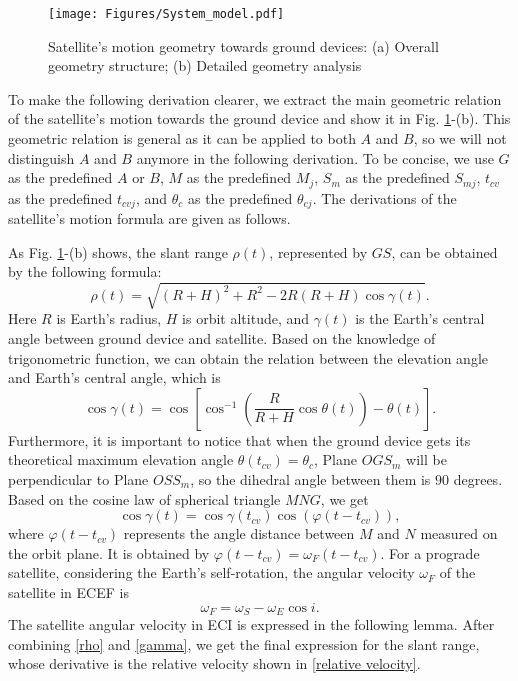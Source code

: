 \documentclass{IEEEtaes}
\theoremstyle{plain}
\begin{document}
\begin{figure}[ht]
  \centering
  \texttt{[image: Figures/System\_model.pdf]}
  \caption{Satellite's motion geometry towards ground devices: (a) Overall geometry structure; (b) Detailed geometry analysis}
  \label{orbit}
\end{figure}
\vspace{-1pt}
To make the following derivation clearer, we extract the main geometric relation of the satellite's motion towards the ground device and show it in Fig. \ref{orbit}-(b). This geometric relation is general as it can be applied to both $A$ and $B$, so we will not distinguish $A$ and $B$ anymore in the following derivation. To be concise, we use $G$ as the predefined $A$ or $B$, $M$ as the predefined $M_{j}$, $S_m$ as the predefined $S_{mj}$, $t_{cv}$ as the predefined $t_{c\!v\!j}$, and $\theta_c$ as the predefined $\theta_{c\!j}$. The derivations of the satellite's motion formula are given as follows.

As Fig. \ref{orbit}-(b) shows, the slant range $\rho(t)$, represented by $GS$, can be obtained by the following formula:
\begin{equation}
  \label{rho}
  \rho(t) = \sqrt{(R+H)^2+R^2-2R(R+H)\cos\gamma(t)}.
\end{equation}
Here $R$ is Earth's radius, $H$ is orbit altitude, and $\gamma(t)$ is the Earth's central angle between ground device and satellite. Based on the knowledge of trigonometric function, we can obtain the relation between the elevation angle and Earth's central angle, which is
\begin{equation}
  \label{gamma and elev}
  \cos\gamma(t) = \cos\left[\cos^{-1}\left (\frac{R}{R+H}\cos\theta(t)\right)-\theta(t)\right].
\end{equation}
Furthermore, it is important to notice that when the ground device gets its theoretical maximum elevation angle $\theta(t_{c\!v}) = \theta_c$, Plane $O\!G\!S_m$ will be perpendicular to Plane $O\!S\!S_m$\cite{ali1998doppler}, so the dihedral angle between them is $90$ degrees. Based on the cosine law of spherical triangle $M\!N\!G$, we get
\begin{equation}
  \label{gamma}
  \cos\gamma(t) = \cos\gamma(t_{c\!v})\cos\left(\varphi(t-t_{c\!v})\right),
\end{equation}
where $\varphi(t-t_{c\!v})$ represents the angle distance between $M$ and $N$ measured on the orbit plane. It is obtained by $\varphi(t-t_{c\!v}) = \omega_F(t-t_{c\!v})$. For a prograde satellite, considering the Earth's self-rotation, the angular velocity $\omega_F$ of the satellite in ECEF is
\begin{equation}
  \label{angular}
  \omega_F = \omega_S - \omega_E \cos i.
\end{equation}
The satellite angular velocity in ECI is expressed in the following lemma. After combining \eqref{rho} and \eqref{gamma}, we get the final expression for the slant range, whose derivative is the relative velocity shown in  \eqref{relative velocity}.
\end{document}
